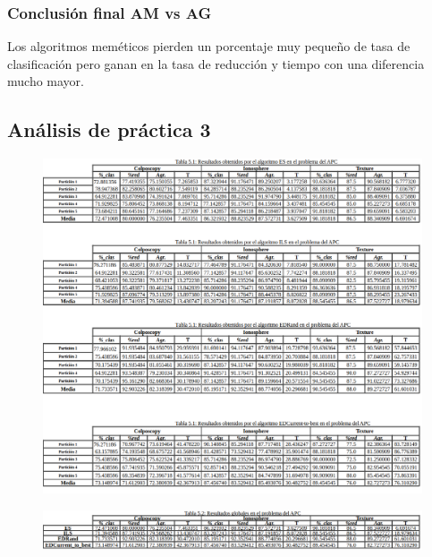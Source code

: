 \documentclass[titlepage]{article}
\begin{document}
	\subsubsection{Conclusión final AM vs AG}
	Los algoritmos meméticos pierden un porcentaje muy pequeño de tasa de clasificación pero ganan en la tasa de reducción y tiempo con una diferencia mucho mayor.
	
	\subsection{Análisis de práctica 3}
	\begin{figure}[H]
		\centering
		\includegraphics[width=1\linewidth]{screenshot013}
		\caption{}
		\label{fig:screenshot013}
	\end{figure}
	\begin{figure}[H]
		\centering
		\includegraphics[width=1\linewidth]{screenshot014}
		\caption{}
		\label{fig:screenshot014}
	\end{figure}
	
	
\end{document}

